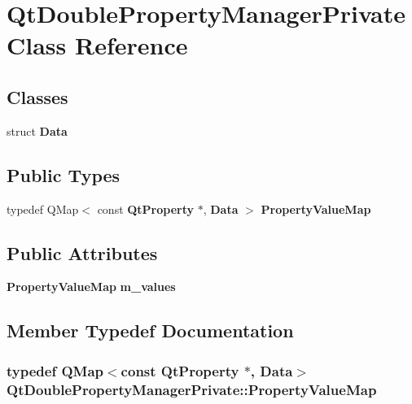 \section{Qt\+Double\+Property\+Manager\+Private Class Reference}
\label{classQtDoublePropertyManagerPrivate}
\subsection*{Classes}
\begin{DoxyCompactItemize}
\item 
struct {\bf Data}
\end{DoxyCompactItemize}
\subsection*{Public Types}
\begin{DoxyCompactItemize}
\item 
typedef Q\+Map$<$ const {\bf Qt\+Property} $\ast$, {\bf Data} $>$ {\bf Property\+Value\+Map}
\end{DoxyCompactItemize}
\subsection*{Public Attributes}
\begin{DoxyCompactItemize}
\item 
{\bf Property\+Value\+Map} {\bf m\+\_\+values}
\end{DoxyCompactItemize}


\subsection{Member Typedef Documentation}
\subsubsection[{Property\+Value\+Map}]{\setlength{\rightskip}{0pt plus 5cm}typedef Q\+Map$<$const {\bf Qt\+Property} $\ast$, {\bf Data}$>$ {\bf Qt\+Double\+Property\+Manager\+Private\+::\+Property\+Value\+Map}}\label{classQtDoublePropertyManagerPrivate_aed30afd2bc42571ee7a1766391913671}


